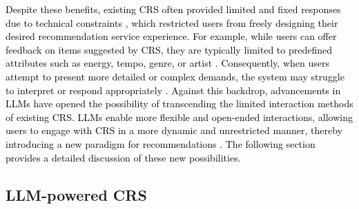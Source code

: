 \textcolor{black}{Despite these benefits, existing CRS often provided limited and fixed responses due to technical constraints \cite{zhang2024towards}, which restricted users from freely designing their desired recommendation service experience. For example, while users can offer feedback on items suggested by CRS, they are typically limited to predefined attributes such as energy, tempo, genre, or artist \cite{jin2019musicbot, cai2021critiquing}. Consequently, when users attempt to present more detailed or complex demands, the system may struggle to interpret or respond appropriately \cite{jin2019musicbot}. Against this backdrop, advancements in LLMs have opened the possibility of transcending the limited interaction methods of existing CRS. LLMs enable more flexible and open-ended interactions, allowing users to engage with CRS in a more dynamic and unrestricted manner, thereby introducing a new paradigm for recommendations \cite{sharma2024generative}. The following section provides a detailed discussion of these new possibilities. }


\subsection{LLM-powered CRS}


